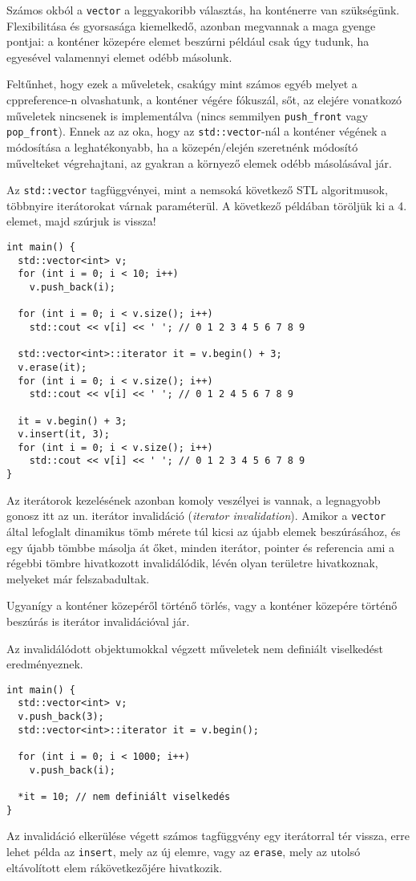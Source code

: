 \documentclass[../cpp_book/cpp_book.tex]{subfiles}
\begin{document}
	\begin{note}
		Számos okból a \texttt{vector} a leggyakoribb választás, ha konténerre van szükségünk. Flexibilitása és gyorsasága kiemelkedő, azonban megvannak a maga gyenge pontjai: a konténer közepére elemet beszúrni például csak úgy tudunk, ha egyesével valamennyi elemet odébb másolunk.
	\end{note}
	
	Feltűnhet, hogy ezek a műveletek, csakúgy mint számos egyéb melyet a cppreference-n olvashatunk, a konténer végére fókuszál, sőt, az elejére vonatkozó műveletek nincsenek is implementálva (nincs semmilyen \texttt{push\_front} vagy \texttt{pop\_front}). Ennek az az oka, hogy az \texttt{std::vector}-nál a konténer végének a módosítása a leghatékonyabb, ha a közepén/elején szeretnénk módosító művelteket végrehajtani, az gyakran a környező elemek odébb másolásával jár.

	\medskip
	Az \texttt{std::vector} tagfüggvényei, mint a nemsoká következő STL algoritmusok, többnyire iterátorokat várnak paraméterül. A következő példában töröljük ki a 4. elemet, majd szúrjuk is vissza!
	\begin{lstlisting}
int main() {
  std::vector<int> v;
  for (int i = 0; i < 10; i++)
    v.push_back(i);

  for (int i = 0; i < v.size(); i++)
    std::cout << v[i] << ' '; // 0 1 2 3 4 5 6 7 8 9

  std::vector<int>::iterator it = v.begin() + 3;
  v.erase(it);
  for (int i = 0; i < v.size(); i++)
    std::cout << v[i] << ' '; // 0 1 2 4 5 6 7 8 9

  it = v.begin() + 3;
  v.insert(it, 3);
  for (int i = 0; i < v.size(); i++)
    std::cout << v[i] << ' '; // 0 1 2 3 4 5 6 7 8 9
}
	\end{lstlisting}
	Az iterátorok kezelésének azonban komoly veszélyei is vannak, a legnagyobb gonosz itt az un. iterátor invalidáció (\textit{iterator invalidation}). Amikor a \texttt{vector} által lefoglalt dinamikus tömb mérete túl kicsi az újabb elemek beszúrásához, és egy újabb tömbbe másolja át őket, minden iterátor, pointer és referencia ami a régebbi tömbre hivatkozott invalidálódik, lévén olyan területre hivatkoznak, melyeket már felszabadultak. 
	\smallskip
	
	Ugyanígy a konténer közepéről történő törlés, vagy a konténer közepére történő beszúrás is iterátor invalidációval jár.
	\smallskip
	
	Az invalidálódott objektumokkal végzett műveletek nem definiált viselkedést eredményeznek.
	\begin{lstlisting}
int main() {
  std::vector<int> v;
  v.push_back(3);
  std::vector<int>::iterator it = v.begin();

  for (int i = 0; i < 1000; i++)
    v.push_back(i);

  *it = 10; // nem definiált viselkedés
}
	\end{lstlisting}
	Az invalidáció elkerülése végett számos tagfüggvény egy iterátorral tér vissza, erre lehet példa az \texttt{insert}, mely az új elemre, vagy az \texttt{erase}, mely az utolsó eltávolított elem rákövetkezőjére hivatkozik.
	
\end{document}
